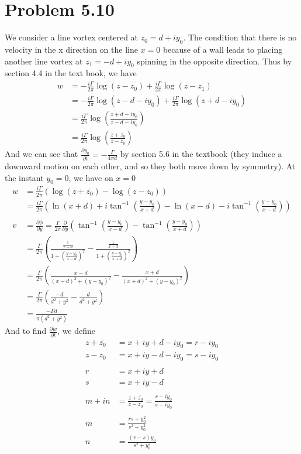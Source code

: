 \documentclass[12pt]{article}
\newcommand{\eq}[1]{\begin{align*}#1\end{align*}}
\newcommand{\p}[2]{\frac{\partial#1}{\partial#2}}
\begin{document}
\section*{Problem 5.10}
We consider a line vortex centered at $z_0 = d + iy_0$. The condition that there is no velocity in the x direction on the line $x = 0$ because of a wall leads to placing another line vortex at $z_1 = -d + iy_0$ spinning in the opposite direction. Thus by section 4.4 in the text book, we have
\eq{
	w &= -\frac{i\Gamma}{2\pi}\log(z - z_0) + \frac{i\Gamma}{2\pi}\log(z - z_1)\\
	&= -\frac{i\Gamma}{2\pi}\log(z - d - iy_0) + \frac{i\Gamma}{2\pi}\log(z + d - iy_0)\\
	&= \frac{i\Gamma}{2\pi}\log(\frac{z + d - iy_0}{z - d - iy_0})\\
	&= \frac{i\Gamma}{2\pi}\log(\frac{z + \bar{z_0}}{z - z_0})
}
And we can see that $\p{y_0}{t} = -\frac{\Gamma}{4\pi d}$ by section 5.6 in the textbook (they induce a downward motion on each other, and so they both move down by symmetry).
At the instant $y_0 = 0$, we have on $x = 0$
\eq{
	w &= \frac{i\Gamma}{2\pi}\left( \log(z + \bar{z_0}) - \log(z - z_0)\right)\\
	&= \frac{i\Gamma}{2\pi}\left( \ln(x + d) + i\tan^{-1}\left(\frac{y - y_0}{x + d}\right) - \ln(x - d) - i\tan^{-1}\left(\frac{y - y_0}{x - d}\right) \right)\\
	\\
	v &= \p{\phi}{y} = \frac{\Gamma}{2\pi}\p{}{y}\left( \tan^{-1}\left(\frac{y - y_0}{x - d}\right) - \tan^{-1}\left(\frac{y - y_0}{x + d} \right) \right)\\
	&= \frac{\Gamma}{2\pi}\left( \frac{\frac{1}{x-d}}{1 + \left( \frac{y - y_0}{x -d}\right)^2} - \frac{\frac{1}{x+d}}{1 + \left( \frac{y - y_0}{x + d}\right)^2} \right)\\
	&= \frac{\Gamma}{2\pi}\left( \frac{x-d}{(x-d)^2 + (y-y_0)^2} - \frac{x+d}{(x+d)^2 + (y-y_0)^2} \right)\\
	&= \frac{\Gamma}{2\pi}\left( \frac{-d}{d^2 + y^2} - \frac{d}{d^2 + y^2}\right)\\
	&= \frac{-\Gamma d}{\pi(d^2 + y^2)}
}
And to find $\p{w}{t}$, we define
\eq{
	z + \bar{z_0} &= x + iy + d - iy_0 = r - iy_0\\
	z - z_0 &= x + iy - d - iy_0 = s - iy_0\\
	\\
	r &= x + iy + d\\
	s &= x + iy - d\\
	\\
	m + in &= \frac{z + \bar{z_0}}{z - z_0} = \frac{r - iy_0}{s - iy_0}\\
	\\
	m &= \frac{rs + y_0^2}{s^2 + y_0^2}\\
	n &= \frac{(r-s)y_0}{s^2 + y_0^2}\\
}
\end{document}
